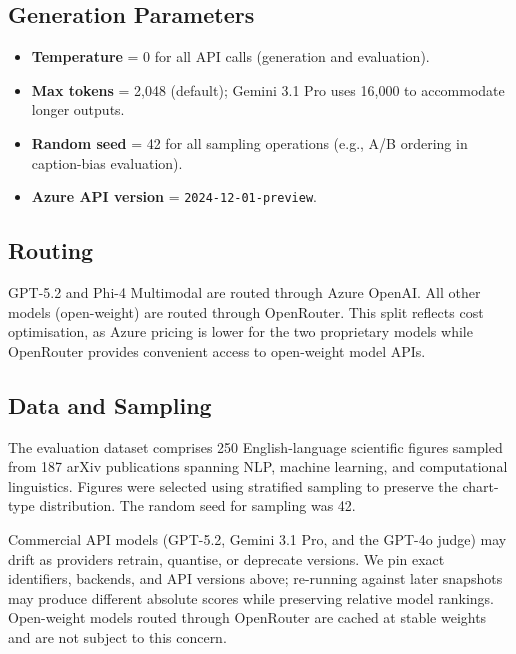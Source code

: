 \subsection{Generation Parameters}

\begin{itemize}[nosep]
  \item \textbf{Temperature} = 0 for all API calls (generation and evaluation).
  \item \textbf{Max tokens} = 2{,}048 (default); Gemini 3.1 Pro uses 16{,}000 to accommodate longer outputs.
  \item \textbf{Random seed} = 42 for all sampling operations (e.g., A/B ordering in caption-bias evaluation).
  \item \textbf{Azure API version} = \texttt{2024-12-01-preview}.
\end{itemize}

\subsection{Routing}

GPT-5.2 and Phi-4 Multimodal are routed through Azure OpenAI. All other models (open-weight) are routed through OpenRouter. This split reflects cost optimisation, as Azure pricing is lower for the two proprietary models while OpenRouter provides convenient access to open-weight model APIs.

\subsection{Data and Sampling}

The evaluation dataset comprises 250 English-language scientific figures sampled from 187 arXiv publications spanning NLP, machine learning, and computational linguistics. Figures were selected using stratified sampling to preserve the chart-type distribution. The random seed for sampling was 42.

Commercial API models (GPT-5.2, Gemini 3.1 Pro, and the GPT-4o judge) may drift as providers retrain, quantise, or deprecate versions. We pin exact identifiers, backends, and API versions above; re-running against later snapshots may produce different absolute scores while preserving relative model rankings. Open-weight models routed through OpenRouter are cached at stable weights and are not subject to this concern.

